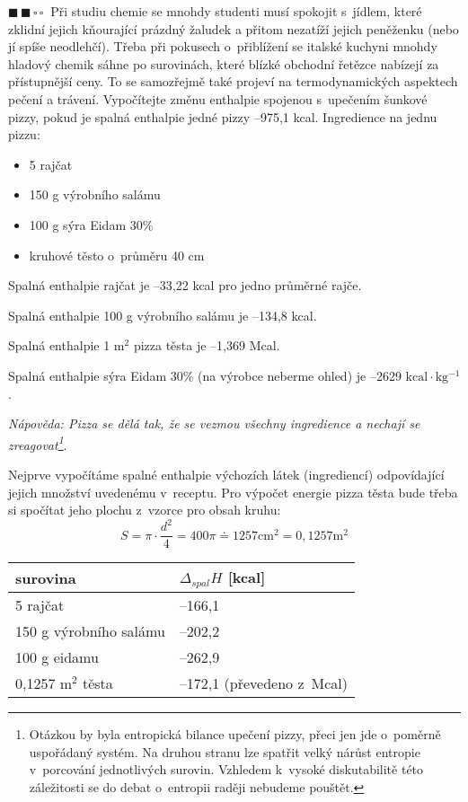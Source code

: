 \documentclass{book}
\newcommand{\dva}{$\blacksquare \, \blacksquare \, \square \, \square \; \; $}
\renewenvironment{quotation}{\par}{\par} %
\begin{document}
\hrulefill %
\begin{quotation}
\dva Při studiu chemie se mnohdy studenti musí spokojit s~jídlem, které
zklidní jejich kňourající prázdný žaludek a přitom nezatíží jejich peněženku
(nebo jí spíše neodlehčí). Třeba při pokusech o~přiblížení se italské
kuchyni mnohdy hladový chemik sáhne po surovinách, které blízké obchodní
řetězce nabízejí za přístupnější ceny. To se samozřejmě také projeví
na termodynamických aspektech pečení a trávení. Vypočítejte změnu
enthalpie spojenou s~upečením šunkové pizzy, pokud je spalná enthalpie
jedné pizzy --975,1 kcal. Ingredience na jednu pizzu:
\begin{itemize}
    \item 5 rajčat 
    \item 150 g výrobního salámu
    \item 100 g sýra Eidam 30\% 
    \item kruhové těsto o~průměru 40 cm 
\end{itemize}

\newpage %

Spalná enthalpie rajčat je --33,22 kcal pro jedno průměrné rajče. 

Spalná enthalpie 100 g výrobního salámu je --134,8 kcal. 

Spalná enthalpie 1 $\mathrm{m^{2}}$ pizza těsta je --1,369 Mcal. 

Spalná enthalpie sýra Eidam 30\% (na výrobce neberme ohled) je --2629 $\mathrm{kcal\cdot kg^{-1}}$.

\textit{Nápověda: Pizza se dělá tak, že se vezmou všechny ingredience a nechají
se zreagovat\footnote{Otázkou by byla entropická bilance upečení pizzy, přeci jen jde o~poměrně uspořádaný systém. Na druhou stranu lze spatřit velký nárůst entropie v~porcování jednotlivých surovin. Vzhledem k~vysoké diskutabilitě této záležitosti se do debat o~entropii raději nebudeme pouštět.}}.
\end{quotation} \dotfill \par 
Nejprve vypočítáme spalné enthalpie výchozích látek (ingrediencí)
odpovídající jejich množství uvedenému v~receptu. Pro výpočet energie pizza těsta bude třeba si spočítat jeho plochu z~vzorce pro obsah kruhu:
\[
S=\pi \cdot \frac{d^2}{4}=400\pi \doteq 1257 \mathrm{cm^2}=0,1257 \mathrm{m^2}
\]
\begin{center}
\begin{tabular}{l|l}
surovina & $\Delta _{spal} H$ [kcal]   \\
\hline\hline
5 rajčat  & --166,1                      \\\hline
150 g výrobního salámu &   --202,2                                   \\\hline
100 g eidamu & --262,9 \\\hline
0,1257 $\mathrm{m^2}$ těsta & --172,1 (převedeno z~Mcal)
\end{tabular}
\end{center}
\end{document}
